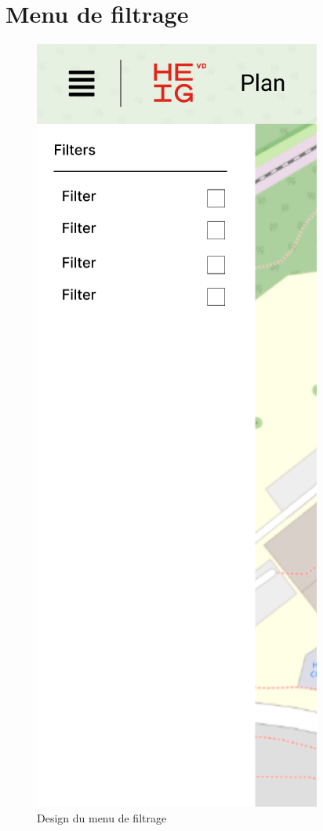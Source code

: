 \documentclass[
    iai, %
    il, %
]{heig-tb}
\begin{document}
\section{Menu de filtrage}

\begin{figure}[H]
    \caption{Design du menu de filtrage}
    \centering
    \includegraphics[scale=0.5]{designFilter.png}
\end{figure}
\end{document}
